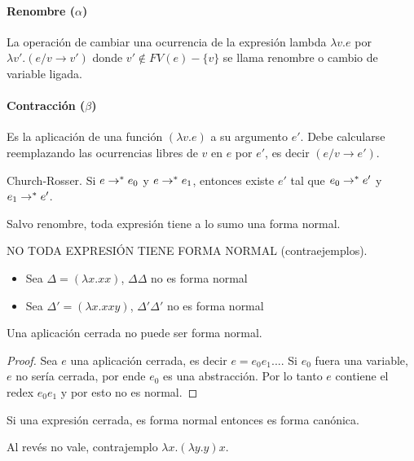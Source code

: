   \paragraph{Renombre ($\alpha$)}
    La operación de cambiar una ocurrencia de la expresión lambda
      $\lambda v.e$ por $\lambda v'.(e/v \to v')$ donde
      $v' \not\in FV(e) - \{v\}$ se llama renombre o cambio de variable
      ligada.

  \paragraph{Contracción ($\beta$)}  
    Es la aplicación de una función
      $(\lambda v.e)$ a su argumento $e'$. Debe calcularse reemplazando las
      ocurrencias libres de $v$ en $e$ por $e'$, es decir $(e/v\to e')$.
        
  \begin{theorem}{Church-Rosser.}
    Si $e \to^\ast e_0$ y $e \to^\ast e_1$, entonces existe $e'$ tal que
    $e_0 \to^\ast e'$ y $e_1 \to^\ast e'$.
  \end{theorem}
        
  \begin{corollary}
    Salvo renombre, toda expresión tiene a lo sumo una forma normal.
  \end{corollary}

  \vspace{3mm}
  \PN NO TODA EXPRESIÓN TIENE FORMA NORMAL (contraejemplos).
  \begin{itemize}
    \item Sea $\Delta = (\lambda x.xx)$, $\Delta \Delta$ no es forma normal
    \item Sea $\Delta' = (\lambda x.xxy)$, $\Delta' \Delta'$ no es forma normal
  \end{itemize}
  
  \begin{property}
    Una aplicación cerrada no puede ser forma normal.
  \end{property}
  \begin{proof}
    \PN Sea $e$ una aplicación cerrada, es decir $e = e_0 e_1 ...$. Si $e_0$ fuera una variable, $e$ no sería cerrada, por ende $e_0$ es una abstracción. Por lo tanto $e$ contiene el redex $e_0 e_1$ y por esto no es normal.
  \end{proof}

  \begin{corollary}
    Si una expresión cerrada, es forma normal entonces es forma canónica.
  \end{corollary}
  \PN Al revés no vale, contrajemplo $\lambda x. (\lambda y. y) x$.

